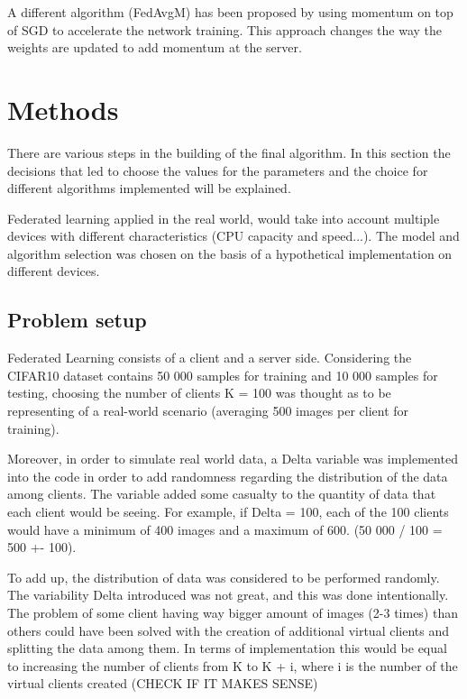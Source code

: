 \documentclass[twocolumn]{article}
\begin{document}
A different algorithm (FedAvgM) has been proposed by \cite{DBLP:journals/corr/abs-1909-06335} using momentum on top of SGD to accelerate the network training. This approach changes the way the weights are updated to add momentum at the server.

\section{Methods} %
There are various steps in the building of the final algorithm. In this section the decisions that led to choose the values for the parameters and the choice for different algorithms implemented will be explained. 

Federated learning applied in the real world, would take into account multiple devices with different characteristics (CPU capacity and speed...). The model and algorithm selection was chosen on the basis of a hypothetical implementation on different devices.  

\subsection{Problem setup}
Federated Learning consists of a client and a server side. Considering the CIFAR10 dataset contains 50 000 samples for training and 10 000 samples for testing, choosing the number of clients K = 100 was thought as to be representing of a real-world scenario (averaging 500 images per client for training). 

Moreover, in order to simulate real world data, a Delta variable was implemented into the code in order to add randomness regarding the distribution of the data among clients. The variable added some casualty to the quantity of data that each client would be seeing. For example, if Delta = 100, each of the 100 clients would have a minimum of 400 images and a maximum of 600. (50 000 / 100 = 500 +- 100).


To add up, the distribution of data was considered to be performed randomly. The variability Delta introduced was not great, and this was done intentionally. The problem of some client having way bigger amount of images (2-3 times) than others could have been solved with the creation of additional virtual clients and splitting the data among them. In terms of implementation this would be equal to increasing the number of clients from K to K + i, where i is the number of the virtual clients created (CHECK IF IT MAKES SENSE) 
\end{document}
